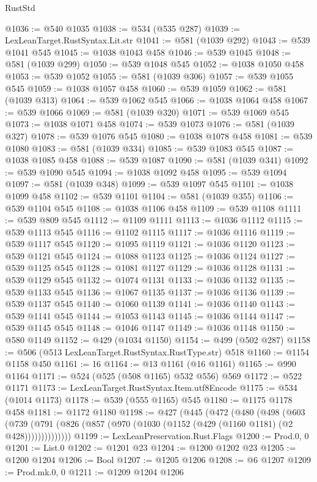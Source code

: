 \begin{lexlean}{RustStd}
\begin{coremodule}
{\begin{coremodule}
{{{{{{{{{{{{{@1036 := @540 @1035
@1038 := @534 (@535 @287)
@1039 := LexLeanTarget.RustSyntax.Lit.str
@1041 := @581 (@1039 @292)
@1043 := @539 @1041 @545
@1045 := @1038 @1043 @458
@1046 := @539 @1045
@1048 := @581 (@1039 @299)
@1050 := @539 @1048 @545
@1052 := @1038 @1050 @458
@1053 := @539 @1052
@1055 := @581 (@1039 @306)
@1057 := @539 @1055 @545
@1059 := @1038 @1057 @458
@1060 := @539 @1059
@1062 := @581 (@1039 @313)
@1064 := @539 @1062 @545
@1066 := @1038 @1064 @458
@1067 := @539 @1066
@1069 := @581 (@1039 @320)
@1071 := @539 @1069 @545
@1073 := @1038 @1071 @458
@1074 := @539 @1073
@1076 := @581 (@1039 @327)
@1078 := @539 @1076 @545
@1080 := @1038 @1078 @458
@1081 := @539 @1080
@1083 := @581 (@1039 @334)
@1085 := @539 @1083 @545
@1087 := @1038 @1085 @458
@1088 := @539 @1087
@1090 := @581 (@1039 @341)
@1092 := @539 @1090 @545
@1094 := @1038 @1092 @458
@1095 := @539 @1094
@1097 := @581 (@1039 @348)
@1099 := @539 @1097 @545
@1101 := @1038 @1099 @458
@1102 := @539 @1101
@1104 := @581 (@1039 @355)
@1106 := @539 @1104 @545
@1108 := @1038 @1106 @458
@1109 := @539 @1108
@1111 := @539 @809 @545
@1112 := @1109 @1111
@1113 := @1036 @1112
@1115 := @539 @1113 @545
@1116 := @1102 @1115
@1117 := @1036 @1116
@1119 := @539 @1117 @545
@1120 := @1095 @1119
@1121 := @1036 @1120
@1123 := @539 @1121 @545
@1124 := @1088 @1123
@1125 := @1036 @1124
@1127 := @539 @1125 @545
@1128 := @1081 @1127
@1129 := @1036 @1128
@1131 := @539 @1129 @545
@1132 := @1074 @1131
@1133 := @1036 @1132
@1135 := @539 @1133 @545
@1136 := @1067 @1135
@1137 := @1036 @1136
@1139 := @539 @1137 @545
@1140 := @1060 @1139
@1141 := @1036 @1140
@1143 := @539 @1141 @545
@1144 := @1053 @1143
@1145 := @1036 @1144
@1147 := @539 @1145 @545
@1148 := @1046 @1147
@1149 := @1036 @1148
@1150 := @580 @1149
@1152 := @429 (@1034 @1150)
@1154 := @499 (@502 @287)
@1158 := @506 (@513 LexLeanTarget.RustSyntax.RustType.str) @518
@1160 := @1154 @1158 @450
@1161 := 16
@1164 := @13 @1161 (@16 @1161)
@1165 := @990 @1164
@1171 := @524 (@525 (@508 @1165) @532 @556) @569
@1172 := @522 @1171
@1173 := LexLeanTarget.RustSyntax.Item.utf8Encode
@1175 := @534 (@1014 @1173)
@1178 := @539 (@555 @1165) @545
@1180 := @1175 @1178 @458
@1181 := @1172 @1180
@1198 := @427
    (@445
      (@472
        (@480
          (@498
            (@603
              (@739 (@791 (@826 (@857 (@970 (@1030 (@1152 (@429 (@1160 @1181) (@2 @428))))))))))))))
@1199 := LexLeanPreservation.Rust.Flags
@1200 := Prod.{0, 0}
@1201 := List.{0}
@1202 := @1201 @23
@1204 := @1200 @1202 @23
@1205 := @1200 @1204
@1206 := Bool
@1207 := @1205 @1206
@1208 := @6 @1207
@1209 := Prod.mk.{0, 0}
@1211 := @1209 @1204 @1206
}}}}}}}}}}}}}
\end{coremodule}}
\end{coremodule}
\end{lexlean}
